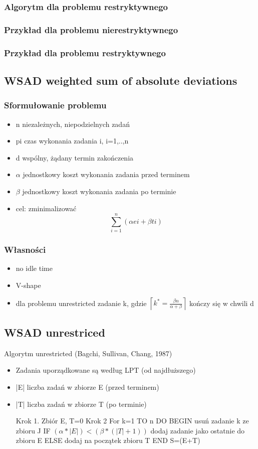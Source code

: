 \documentclass[12pt,a4paper]{article}
\begin{document}
\subsubsection{Algorytm dla problemu restryktywnego}
\subsubsection{Przykład dla problemu nierestryktywnego}
\subsubsection{Przykład dla problemu restryktywnego}
\subsection{WSAD weighted sum of absolute deviations}
\subsubsection{Sformułowanie problemu}
\begin{itemize}
\item n niezależnych, niepodzielnych zadań
\item pi czas wykonania zadania i, i=1,..,n
\item d wspólny, żądany termin zakończenia
\item $\alpha$ jednostkowy koszt wykonania zadania przed terminem
\item $\beta$ jednostkowy koszt wykonania zadania po terminie
\item cel: zminimalizować \begin{equation}
\sum\limits_{i=1}^{n}(\alpha ei+\beta ti)
\end{equation}
\end{itemize}
\subsubsection{Własności}
\begin{itemize}
\item no idle time
\item V-shape
\item dla problemu unrestricted zadanie k, gdzie $\left \lceil k^*=\frac{\beta n}{\alpha + \beta} \right \rceil$ kończy się w chwili d
\end{itemize}

\subsection{WSAD unrestriced}
Algorytm unrestricted (Bagchi, Sullivan, Chang, 1987)
\begin{itemize}
\item Zadania uporządkowane są według LPT (od najdłuższego)
\item |E| liczba zadań w zbiorze E (przed terminem)
\item |T| liczba zadań w zbiorze T (po terminie)

Krok 1. Zbiór E, T=0
Krok 2 For k=1 TO n DO
BEGIN
usuń zadanie k ze zbioru J
IF $(\alpha * |E|)<(\beta *(|T|+1))$ dodaj zadanie jako ostatnie do zbioru E
ELSE dodaj na początek zbioru T
END
S=(E+T)
\end{itemize}
\end{document}

